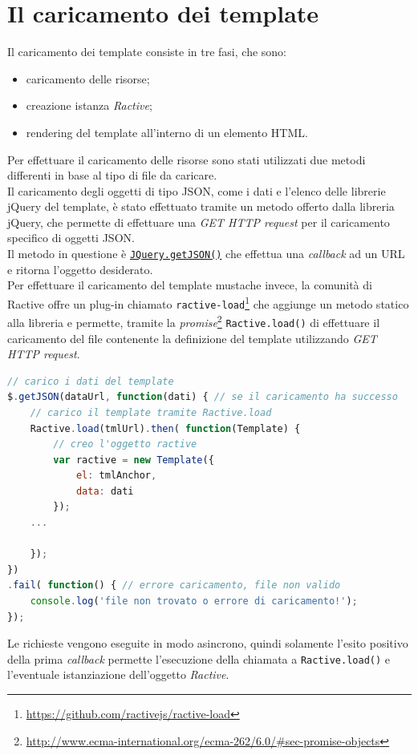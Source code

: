 \section{Il caricamento dei template}
Il caricamento dei template consiste in tre fasi, che sono:
\begin{itemize}
	\item caricamento delle risorse;
	\item creazione istanza \textit{Ractive};
	\item rendering del template all'interno di un elemento HTML.
\end{itemize}
Per effettuare il caricamento delle risorse sono stati utilizzati due metodi differenti in base al tipo di file da caricare.\\
Il caricamento degli oggetti di tipo JSON, come i dati e l'elenco delle librerie jQuery del template, è stato effettuato tramite un metodo offerto dalla libreria jQuery, che permette di effettuare una \textit{GET HTTP request} per il caricamento specifico di oggetti JSON.\\
Il metodo in questione è \href{http://api.jquery.com/jquery.getjson/}{\texttt{JQuery.getJSON()}} che effettua una \textit{callback} ad un URL e ritorna l'oggetto desiderato.\\
Per effettuare il caricamento del template mustache invece, la comunità di Ractive offre un plug-in chiamato \texttt{ractive-load}\footnote{\url{https://github.com/ractivejs/ractive-load}} che aggiunge un metodo statico alla libreria e permette, tramite la  \textit{promise}\footnote{\url{http://www.ecma-international.org/ecma-262/6.0/\#sec-promise-objects}} \texttt{Ractive.load()} di effettuare il caricamento del file contenente la definizione del template utilizzando \textit{GET HTTP request}.
\newpage
\begin{lstlisting}[language=JavaScript, caption=Chiamate \textit{GET HTTP} per il caricamento delle risorse.]
// carico i dati del template
$.getJSON(dataUrl, function(dati) { // se il caricamento ha successo
	// carico il template tramite Ractive.load
	Ractive.load(tmlUrl).then( function(Template) {
		// creo l'oggetto ractive
		var ractive = new Template({
			el: tmlAnchor,
			data: dati
		});
	...

	});
})
.fail( function() { // errore caricamento, file non valido
	console.log('file non trovato o errore di caricamento!');
});
\end{lstlisting}
Le richieste vengono eseguite in modo asincrono, quindi solamente l'esito positivo della prima \textit{callback} permette l'esecuzione della chiamata a \texttt{Ractive.load()} e l'eventuale istanziazione dell'oggetto \textit{Ractive}.\\
